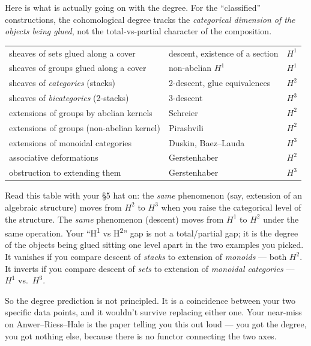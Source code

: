 \documentclass[11pt]{article}
\begin{document}
Here is what is actually going on with the degree.  For the ``classified'' constructions, the cohomological degree tracks the \emph{categorical dimension of the objects being glued}, not the total-vs-partial character of the composition.
\begin{center}
\begin{tabular}{lll}
sheaves of sets glued along a cover        & descent, existence of a section & $H^{1}$ \\
sheaves of groups glued along a cover      & non-abelian $H^{1}$             & $H^{1}$ \\
sheaves of \emph{categories} (stacks)      & 2-descent, glue equivalences    & $H^{2}$ \\
sheaves of \emph{bicategories} (2-stacks)  & 3-descent                       & $H^{3}$ \\
extensions of groups by abelian kernels    & Schreier                        & $H^{2}$ \\
extensions of groups (non-abelian kernel)  & Pirashvili                      & $H^{2}$ \\
extensions of monoidal categories          & Duskin, Baez--Lauda             & $H^{3}$ \\
associative deformations                   & Gerstenhaber                    & $H^{2}$ \\
obstruction to extending them              & Gerstenhaber                    & $H^{3}$ \\
\end{tabular}
\end{center}
Read this table with your \S5 hat on: the \emph{same} phenomenon (say, extension of an algebraic structure) moves from $H^{2}$ to $H^{3}$ when you raise the categorical level of the structure.  The \emph{same} phenomenon (descent) moves from $H^{1}$ to $H^{2}$ under the same operation.  Your ``H\textsuperscript{1} vs H\textsuperscript{2}'' gap is not a total/partial gap; it is the degree of the objects being glued sitting one level apart in the two examples you picked.  It vanishes if you compare descent of \emph{stacks} to extension of \emph{monoids} --- both $H^{2}$.  It inverts if you compare descent of \emph{sets} to extension of \emph{monoidal categories} --- $H^{1}$ vs.\ $H^{3}$.

So the degree prediction is not principled.  It is a coincidence between your two specific data points, and it wouldn't survive replacing either one.  Your near-miss on Anwer--Riess--Hale is the paper telling you this out loud --- you got the degree, you got nothing else, because there is no functor connecting the two axes.
\end{document}
